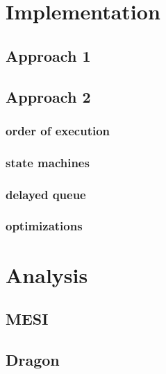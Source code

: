 \documentclass{article}
\begin{document}
\section{Implementation}

\subsection{Approach 1}

\subsection{Approach 2}

\subsubsection{order of execution}

\subsubsection{state machines}

\subsubsection{delayed queue}

\subsubsection{optimizations}

\section{Analysis}

\subsection{MESI}

\subsection{Dragon}
\end{document}
